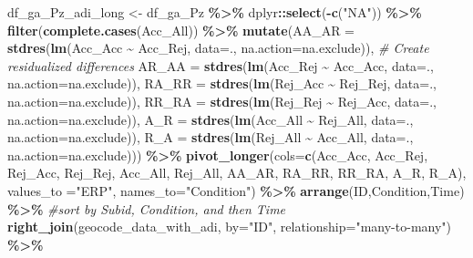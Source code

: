 \documentclass[
]{article}
\newenvironment{Shaded}{\begin{snugshade}}{\end{snugshade}}
\newcommand{\AttributeTok}[1]{\textcolor[rgb]{0.13,0.29,0.53}{#1}}
\newcommand{\CommentTok}[1]{\textcolor[rgb]{0.56,0.35,0.01}{\textit{#1}}}
\newcommand{\FunctionTok}[1]{\textcolor[rgb]{0.13,0.29,0.53}{\textbf{#1}}}
\newcommand{\NormalTok}[1]{#1}
\newcommand{\OtherTok}[1]{\textcolor[rgb]{0.56,0.35,0.01}{#1}}
\newcommand{\SpecialCharTok}[1]{\textcolor[rgb]{0.81,0.36,0.00}{\textbf{#1}}}
\newcommand{\StringTok}[1]{\textcolor[rgb]{0.31,0.60,0.02}{#1}}
\begin{document}
\begin{Shaded}
\begin{Highlighting}[]
\NormalTok{df\_ga\_Pz\_adi\_long }\OtherTok{\textless{}{-}}\NormalTok{ df\_ga\_Pz }\SpecialCharTok{\%\textgreater{}\%}
\NormalTok{  dplyr}\SpecialCharTok{::}\FunctionTok{select}\NormalTok{(}\SpecialCharTok{{-}}\FunctionTok{c}\NormalTok{(}\StringTok{"NA"}\NormalTok{)) }\SpecialCharTok{\%\textgreater{}\%}
  \FunctionTok{filter}\NormalTok{(}\FunctionTok{complete.cases}\NormalTok{(Acc\_All)) }\SpecialCharTok{\%\textgreater{}\%}
  \FunctionTok{mutate}\NormalTok{(}\AttributeTok{AA\_AR =} \FunctionTok{stdres}\NormalTok{(}\FunctionTok{lm}\NormalTok{(Acc\_Acc }\SpecialCharTok{\textasciitilde{}}\NormalTok{ Acc\_Rej, }\AttributeTok{data=}\NormalTok{., }\AttributeTok{na.action=}\NormalTok{na.exclude)), }\CommentTok{\# Create residualized differences}
         \AttributeTok{AR\_AA =} \FunctionTok{stdres}\NormalTok{(}\FunctionTok{lm}\NormalTok{(Acc\_Rej }\SpecialCharTok{\textasciitilde{}}\NormalTok{ Acc\_Acc, }\AttributeTok{data=}\NormalTok{., }\AttributeTok{na.action=}\NormalTok{na.exclude)),}
         \AttributeTok{RA\_RR =} \FunctionTok{stdres}\NormalTok{(}\FunctionTok{lm}\NormalTok{(Rej\_Acc }\SpecialCharTok{\textasciitilde{}}\NormalTok{ Rej\_Rej, }\AttributeTok{data=}\NormalTok{., }\AttributeTok{na.action=}\NormalTok{na.exclude)),}
         \AttributeTok{RR\_RA =} \FunctionTok{stdres}\NormalTok{(}\FunctionTok{lm}\NormalTok{(Rej\_Rej }\SpecialCharTok{\textasciitilde{}}\NormalTok{ Rej\_Acc, }\AttributeTok{data=}\NormalTok{., }\AttributeTok{na.action=}\NormalTok{na.exclude)),}
         \AttributeTok{A\_R =} \FunctionTok{stdres}\NormalTok{(}\FunctionTok{lm}\NormalTok{(Acc\_All }\SpecialCharTok{\textasciitilde{}}\NormalTok{ Rej\_All, }\AttributeTok{data=}\NormalTok{., }\AttributeTok{na.action=}\NormalTok{na.exclude)),}
         \AttributeTok{R\_A =} \FunctionTok{stdres}\NormalTok{(}\FunctionTok{lm}\NormalTok{(Rej\_All }\SpecialCharTok{\textasciitilde{}}\NormalTok{ Acc\_All, }\AttributeTok{data=}\NormalTok{., }\AttributeTok{na.action=}\NormalTok{na.exclude))) }\SpecialCharTok{\%\textgreater{}\%}
  \FunctionTok{pivot\_longer}\NormalTok{(}\AttributeTok{cols=}\FunctionTok{c}\NormalTok{(Acc\_Acc, Acc\_Rej, Rej\_Acc, Rej\_Rej, Acc\_All, Rej\_All, }
\NormalTok{                      AA\_AR, RA\_RR, RR\_RA, A\_R, R\_A), }\AttributeTok{values\_to =}\StringTok{"ERP"}\NormalTok{, }\AttributeTok{names\_to=}\StringTok{"Condition"}\NormalTok{) }\SpecialCharTok{\%\textgreater{}\%}
  \FunctionTok{arrange}\NormalTok{(ID,Condition,Time) }\SpecialCharTok{\%\textgreater{}\%} \CommentTok{\#sort by Subid, Condition, and then Time}
  \FunctionTok{right\_join}\NormalTok{(geocode\_data\_with\_adi, }\AttributeTok{by=}\StringTok{"ID"}\NormalTok{, }\AttributeTok{relationship=}\StringTok{"many{-}to{-}many"}\NormalTok{) }\SpecialCharTok{\%\textgreater{}\%}

\end{Highlighting}
\end{Shaded}
\end{document}
